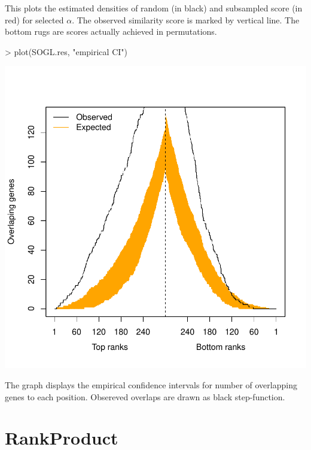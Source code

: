 \documentclass[a4paper]{report}
\begin{document}
This plots the estimated densities of random (in black) and subsampled score (in red) for selected $\alpha$. The observed similarity score is marked by vertical line. The bottom rugs are scores actually achieved in permutations. 
\begin{Schunk}
\begin{Sinput}
> plot(SOGL.res, "empirical CI")
\end{Sinput}
\end{Schunk}
\includegraphics{MAMA-008}
    
The graph displays the empirical confidence intervals for number of overlapping genes to each position. Obsereved overlaps are drawn as black step-function.

\chapter{RankProduct}
\end{document}
